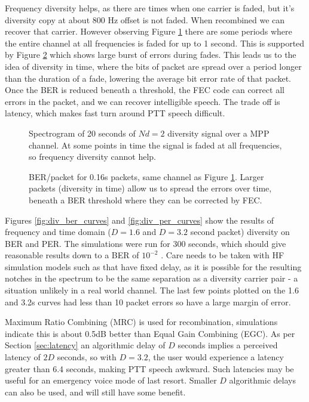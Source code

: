 \documentclass{article}
\begin{document}
Frequency diversity helps, as there are times when one carrier is faded, but it's diversity copy at about 800 Hz offset is not faded.  When recombined we can recover that carrier.  However observing Figure \ref{fig:spectrogram} there are some periods where the entire channel at all frequencies is faded for up to 1 second. This is supported by Figure \ref{fig:ber_packet} which shows large burst of errors during fades. This leads us to the idea of diversity in time, where the bits of packet are spread over a period longer than the duration of a fade, lowering the average bit error rate of that packet. Once the BER is reduced beneath a threshold, the FEC code can correct all errors in the packet, and we can recover intelligible speech. The trade off is latency, which makes fast turn around PTT speech difficult.

\begin{figure}[H]
\caption{Spectrogram of 20 seconds of $Nd=2$ diversity signal over a MPP channel. At some points in time the signal is faded at all frequencies, so frequency diversity cannot help.}
\label{fig:spectrogram}
\begin{center}

\end{center}
\end{figure}

\begin{figure}[H]
\caption{BER/packet for 0.16s packets, same channel as Figure \ref{fig:spectrogram}.  Larger packets (diversity in time) allow us to spread the errors over time, beneath a BER threshold where they can be corrected by FEC.}
\label{fig:ber_packet}
\begin{center}

\end{center}
\end{figure}

Figures \ref{fig:div_ber_curves} and \ref{fig:div_per_curves} show the results of frequency and time domain ($D=1.6$ and $D=3.2$ second packet) diversity on BER and PER.  The simulations were run for 300 seconds, which should give reasonable results down to a BER of $10^{-2}$ \cite{itu1487}. Care needs to be taken with HF simulation models such as \cite{itu1487} that have fixed delay, as it is possible for the resulting notches in the spectrum to be the same separation as a diversity carrier pair - a situation unlikely in a real world channel.  The last few points plotted on the 1.6 and 3.2s curves had less than 10 packet errors so have a large margin of error.

Maximum Ratio Combining (MRC) is used for recombination, simulations indicate this is about 0.5dB better than Equal Gain Combining (EGC). As per Section \ref{sec:latency} an algorithmic delay of $D$ seconds implies a perceived latency of $2D$ seconds, so with $D=3.2$, the user would experience a latency greater than 6.4 seconds, making PTT speech awkward.  Such latencies may be useful for an emergency voice mode of last resort. Smaller $D$ algorithmic delays can also be used, and will still have some benefit.
\end{document}
